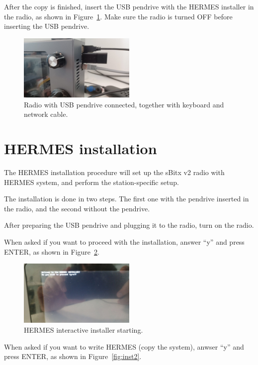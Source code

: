 \documentclass[11pt,a4paper]{article}
\begin{document}
After the copy is finished, insert the USB pendrive with the HERMES installer in the radio, as shown in Figure~\ref{fig:pen1}.
Make sure the radio is turned OFF before inserting the USB pendrive.


\begin{figure}[H]
  \centering
  \includegraphics[width=0.5\textwidth]{pictures/usb-1.jpeg}
  \caption{Radio with USB pendrive connected, together with keyboard and network cable.}
  \label{fig:pen1}
\end{figure}


\section{HERMES installation}

The HERMES installation procedure will set up the sBitx v2 radio with HERMES system,
and perform the station-specific setup.

The installation is done in two steps. The first one with the
pendrive inserted in the radio, and the second without the pendrive.

After preparing the USB pendrive and plugging it to the radio, turn on the radio.

When asked if you want to proceed with the installation, answer ``y'' and press ENTER, as shown in Figure~\ref{fig:inst1}.

\begin{figure}[H]
  \centering
  \includegraphics[width=0.5\textwidth]{pictures/inst-1.jpg}
  \caption{HERMES interactive installer starting.}
  \label{fig:inst1}
\end{figure}

When asked if you want to write HERMES (copy the system), anwser ``y'' and press ENTER, as shown in Figure~\ref{fig:inst2}.
\end{document}
